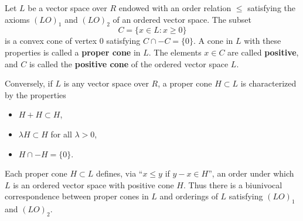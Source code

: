 Let $L$ be a vector space over $R$ endowed with an order relation $\leq$ satisfying the axioms $(LO)_1$ and $(LO)_2$ of an ordered vector space. The subset
$$C = \{x \in L : x \geq 0\}$$
is a convex cone of vertex $0$ satisfying $C \cap -C = \{0\}$. A cone in $L$ with these properties is called a \textbf{proper cone} in $L$. The elements $x \in C$ are called \textbf{positive}, and $C$ is called the \textbf{positive cone} of the ordered vector space $L$.

Conversely, if $L$ is any vector space over $R$, a proper cone $H \subset L$ is characterized by the properties
\begin{itemize}
\item[(i)] $H + H \subset H$,
\item[(ii)] $\lambda H \subset H$ for all $\lambda > 0$,
\item[(iii)] $H \cap -H = \{0\}$.
\end{itemize}
Each proper cone $H \subset L$ defines, via ``$x \leq y$ if $y - x \in H$'', an order under which $L$ is an ordered vector space with positive cone $H$. Thus there is a biunivocal correspondence between proper cones in $L$ and orderings of $L$ satisfying $(LO)_1$ and $(LO)_2$.
